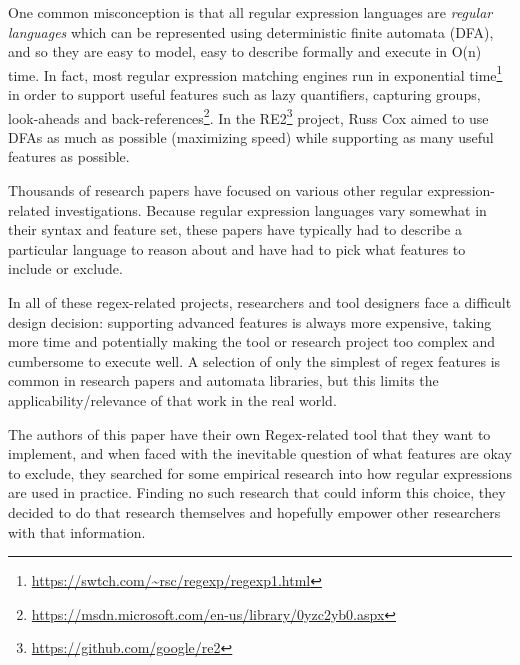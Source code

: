 One common misconception is that all regular expression languages are \emph{regular languages} which can be represented using deterministic finite automata (DFA), and so they are easy to model, easy to describe formally and execute in O(n) time.  In fact, most regular expression matching engines run in exponential time\footnote{\url{https://swtch.com/~rsc/regexp/regexp1.html}} in order to support useful features such as lazy quantifiers, capturing groups, look-aheads and back-references\footnote{\url{https://msdn.microsoft.com/en-us/library/0yzc2yb0.aspx}}.  In the RE2\footnote{\url{https://github.com/google/re2}} project, Russ Cox aimed to use DFAs as much as possible (maximizing speed) while supporting as many useful features as possible.

Thousands of research papers have focused on various other regular expression-related investigations.  Because regular expression languages vary somewhat in their syntax and feature set, these papers have typically had to describe a particular language to reason about and have had to pick what features to include or exclude.

In all of these regex-related projects, researchers and tool designers face a difficult design decision: supporting advanced features is always more expensive, taking more time and potentially making the tool or research project too complex and cumbersome to execute well.  A selection of only the simplest of regex features is common in research papers and automata libraries, but this limits the applicability/relevance of that work in the real world.

The authors of this paper have their own Regex-related tool that they want to implement, and when faced with the inevitable question of what features are okay to exclude, they searched for some empirical research into how regular expressions are used in practice.  Finding no such research that could inform this choice, they decided to do that research themselves and hopefully empower other researchers with that information.






